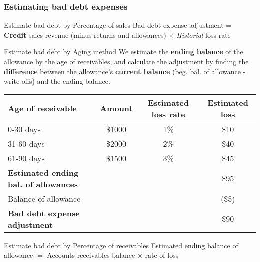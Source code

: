 \subsubsection{Estimating bad debt expenses}

\begin{theorem}
    {Estimate bad debt by Percentage of sales}
    Bad debt expense adjustment = \textbf{Credit} sales revenue (minus returns and allowances) $\times$ \textit{Historial} loss rate
\end{theorem}

\begin{theorem}
    {Estimate bad debt by Aging method}
    We estimate the \textbf{ending balance} of the allowance by the age of receivables, and calculate the adjustment by finding the \textbf{difference} between the allowance's \textbf{current balance} (beg. bal. of allowance - write-offs) and the ending balance.

    \begin{tabular}{lccc}
        \textbf{Age of receivable}                   & \textbf{Amount} & \textbf{Estimated loss rate} & \textbf{Estimated loss} \\
        \hline
        0-30 days                                    & \$1000          & 1\%                          & \$10                    \\
        31-60 days                                   & \$2000          & 2\%                          & \$40                    \\
        61-90 days                                   & \$1500          & 3\%                          & \underline{\$45}        \\
        \textbf{Estimated ending bal. of allowances} &                 &                              & \$95                    \\
        Balance of allowance                         &                 &                              & (\$5)                   \\
        \textbf{Bad debt expense adjustment}         &                 &                              & \$90                    \\
    \end{tabular}
\end{theorem}

\begin{knBox}
    {Estimate bad debt by Percentage of receivables}
    Estimated ending balance of allowance $=$ Accounts receivables balance $\times$ rate of loss
\end{knBox}

